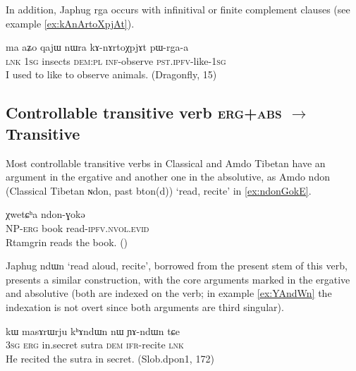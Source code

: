 \documentclass[oldfontcommands,oneside,a4paper,11pt]{article}
\newcommand{\ipa}[1]{{\phon \mbox{#1}}} %
\begin{document}
In addition, Japhug \ipa{rga}  occurs with infinitival or finite complement clauses (see example \ref{ex:kAnArtoXpjAt}).

\begin{exe}
\ex \label{ex:kAnArtoXpjAt}
\gll  
\ipa{ma} 	\ipa{aʑo} 	\ipa{qajɯ} 	\ipa{nɯra} 	\ipa{kɤ-nɤrtoχpjɤt} 	\ipa{pɯ-rga-a} \\
\textsc{lnk} \textsc{1sg} insects \textsc{dem:pl} \textsc{inf}-observe \textsc{pst.ipfv}-like-\textsc{1sg} \\
\glt I used to like to observe animals. (Dragonfly, 15)
\end{exe}

\subsection{Controllable transitive verb \textsc{erg+abs}  $\rightarrow$ Transitive}
Most controllable transitive verbs in Classical and Amdo Tibetan have an argument in the ergative and another one in the absolutive, as Amdo \ipa{ndon} (Classical Tibetan \ipa{ɴdon}, past \ipa{bton(d)}) `read, recite' in \ref{ex:ndonGokE}.


\begin{exe}
\ex \label{ex:ndonGokE}
\gll \ipa{ʂtamɖʐən-ɣə}  \ipa{χwetɕʰa}  \ipa{ndon-ɣokə} \\
NP-\textsc{erg} book read-\textsc{ipfv.nvol.evid} \\
\glt Rtamgrin reads the book. (\citealt[94:265]{haller04themchen})
\end{exe}


Japhug \ipa{ndɯn} `read aloud, recite', borrowed from the present stem of this verb, presents a similar construction, with the core arguments marked in the ergative and absolutive (both are indexed on the verb; in example \ref{ex:YAndWn} the indexation is not overt since both arguments are third singular).

\begin{exe}
\ex \label{ex:YAndWn}
\gll \ipa{ɯʑo} 	\ipa{kɯ} 	\ipa{masɤrɯrju} 	\ipa{kʰɤndɯn} 	\ipa{nɯ} 	\ipa{ɲɤ-ndɯn} 	\ipa{tɕe} \\
\textsc{3sg} \textsc{erg} in.secret sutra \textsc{dem} \textsc{ifr}-recite \textsc{lnk} \\
\glt He recited the sutra in secret. (Slob.dpon1, 172)
\end{exe}
\end{document}
